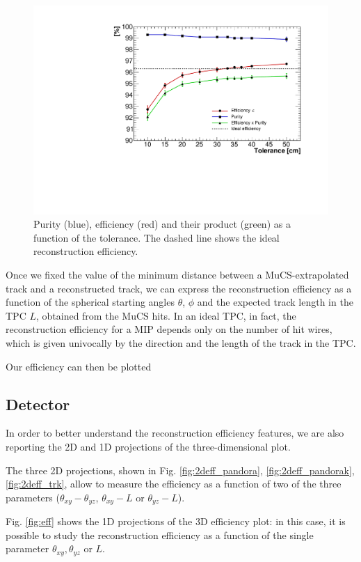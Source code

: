 \documentclass[a4paper]{scrartcl}
\begin{document}
\begin{figure}[htbp]
  \begin{center}
    \includegraphics[width=0.7\linewidth]{figures/tolerance.pdf}
    \caption{Purity (blue), efficiency (red) and their product (green) as a function of the tolerance. The dashed line shows the ideal reconstruction efficiency.} \label{fig:purity}
  \end{center}
\end{figure}

Once we fixed the value of the minimum distance between a MuCS-extrapolated track and a reconstructed track, we can express the reconstruction efficiency as a function of the spherical starting angles $\theta$, $\phi$ and the expected track length in the TPC $L$, obtained from the MuCS hits. In an ideal TPC, in fact, the reconstruction efficiency for a MIP depends only on the number of hit wires, which is given univocally by the direction and the length of the track in the TPC.

Our efficiency can then be plotted

\subsection{Detector}

In order to better understand the reconstruction efficiency features, we are also reporting the 2D and 1D projections of the three-dimensional plot.

The three 2D projections, shown in Fig. \ref{fig:2deff_pandora}, \ref{fig:2deff_pandorak}, \ref{fig:2deff_trk}, allow to measure the efficiency as a function of two of the three parameters ($\theta_{xy}-\theta_{yz}$, $\theta_{xy}-L$ or $\theta_{yz}-L$).

Fig. \ref{fig:eff} shows the 1D projections of the 3D efficiency plot: in this case, it is possible to study the reconstruction efficiency as a function of the single parameter $\theta_{xy}, \theta_{yz}$ or $L$.
\end{document}
